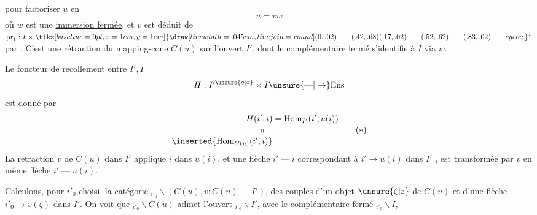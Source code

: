 
pour factoriser $u$ en
\[
u=vw
\]
où $w$ est une \uline{immersion fermée},
et $v$ est déduit de $\mathrm{pr}_1:I\times\mathord{\tikz[baseline=0pt,x=1em,y=1em]{\draw[line width=.045em,line join=round] (0,.02)--(.42,.68) (.17,.02)--(.52,.62)--(.83,.02)--cycle;}}^1$ par
. C'est une rétraction du
mapping-cone $C(u)$ sur l'ouvert $I'$, dont
le complémentaire fermé s'identifie à $I$ via $w$.

Le foncteur de recollement entre $I',I$
\[
H:I'^{\unsure{o|\circ}}\times I\unsure{\text{---}|\to}\mathrm{Ens}
\]
est donné par
\[
\begin{aligned}
H(i',i)&=\mathrm{Hom}_{I'}(i',u(i))\\[-2pt]
\shortparallel\quad&\\[-2pt]
\inserted{\mathrm{Hom}_{C(u)}(i',i)}&
\end{aligned}
\tag*{$(*)$}
\]
La rétraction $v$ de $C(u)$ dans $I'$ applique
$i$ dans $u(i)$, et une flèche $i'\mathrel{\text{---}}i$
correspondant à $i'\longrightarrow u(i)$ dans $I'$ , est transformée
par $v$ en  même flèche $i'\mathrel{\text{---}}u(i)$.

Calculons, pour $i'_0$ choisi, la catégorie
$\mathord{}_{i'_0}\backslash(C(u),v:C(u)\mathrel{\text{---}}I')$, des couples d'un
objet $\unsure{\zeta|z}$ de $C(u)$ et d'une flèche
$i'_0\longrightarrow v(\zeta)$ dans $I'$. On voit que $\mathord{}_{i'_0}\backslash C(u)$
admet l'ouvert $\mathord{}_{i'_0}\backslash I'$, avec
le complémentaire fermé $\mathord{}_{i'_0}\backslash I$,


